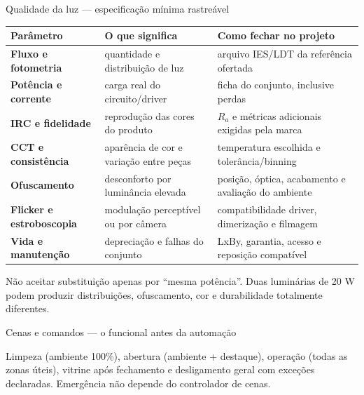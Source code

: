 \begin{frame}{Qualidade da luz — especificação mínima rastreável}
\scriptsize
\begin{tabularx}{\textwidth}{>{\bfseries}p{2.55cm}X X}
\toprule
Parâmetro & O que significa & Como fechar no projeto \\
\midrule
Fluxo e fotometria & quantidade e distribuição de luz & arquivo IES/LDT da referência ofertada \\
Potência e corrente & carga real do circuito/driver & ficha do conjunto, inclusive perdas \\
IRC e fidelidade & reprodução das cores do produto & $R_a$ e métricas adicionais exigidas pela marca \\
CCT e consistência & aparência de cor e variação entre peças & temperatura escolhida e tolerância/binning \\
Ofuscamento & desconforto por luminância elevada & posição, óptica, acabamento e avaliação do ambiente \\
Flicker e estroboscopia & modulação perceptível ou por câmera & compatibilidade driver, dimerização e filmagem \\
Vida e manutenção & depreciação e falhas do conjunto & LxBy, garantia, acesso e reposição compatível \\
\bottomrule
\end{tabularx}
\begin{caixaAt}
Não aceitar substituição apenas por “mesma potência”. Duas luminárias de 20 W podem produzir distribuições, ofuscamento, cor e durabilidade totalmente diferentes.
\end{caixaAt}
\end{frame}

\begin{frame}{Cenas e comandos — o funcional antes da automação}
\centering
{}
\vspace{2mm}
\begin{caixaProjeto}[title=Cenas previstas]
Limpeza (ambiente 100\%), abertura (ambiente + destaque), operação (todas as zonas úteis), vitrine após fechamento e desligamento geral com exceções declaradas. Emergência não depende do controlador de cenas.
\end{caixaProjeto}
\end{frame}


